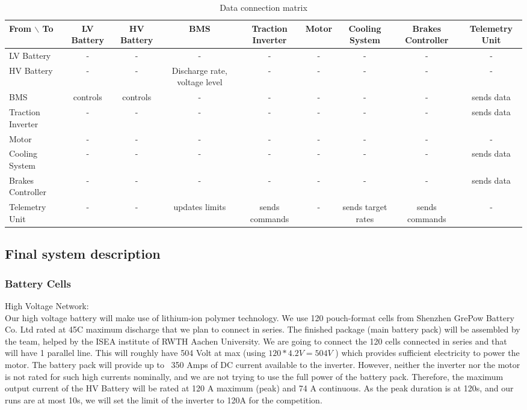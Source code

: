 \begin{table}
    \centering
    \begin{adjustbox}{width=\textwidth,center}
    \begin{tabular}{|l|c|c|c|c|c|c|c|c|}
    \hline
    From $\backslash$ To & LV Battery & HV Battery & BMS & Traction Inverter & Motor & Cooling System & Brakes Controller & Telemetry Unit  \\
    \hline
    LV Battery & - & - & - & - & - & - & - & - \\
    HV Battery  & - & - & Discharge rate, voltage level & - & - & - & - & - \\
    BMS & controls & controls & - & - & - & - & - & sends data \\
    Traction Inverter & - & - & - & - & - & - & - & sends data \\
    Motor & - & - & - & - & - & - & - & - \\
    Cooling System & - & - & - & - & - & - & - & sends data \\
    Brakes Controller & - & - & - & - & - & - & - & sends data \\
    Telemetry Unit & - & - & updates limits & sends commands & - & sends target rates & sends commands & - \\
    \hline
    \end{tabular}
    \end{adjustbox}
    \caption{Data connection matrix}
    \label{data-connectivity-matrix-battery}
\end{table}


\subsection{Final system description}
\subsubsection{Battery Cells}

High Voltage Network: \\
Our high voltage battery will make use of lithium-ion polymer technology. We use 120 pouch-format cells from Shenzhen GrePow Battery Co. Ltd rated at 45C maximum discharge that we plan to connect in series. 
The finished package (main battery pack) will be assembled by the team, helped by the ISEA institute of RWTH Aachen University.
We are going to connect the 120 cells connected in series and that will have 1 parallel line. This will roughly have 504 Volt at max (using \(120 * 4.2V = 504 V \) ) 
which provides sufficient electricity to power the motor.
The battery pack will provide up to ~350 Amps of DC current available to the inverter. However, neither the inverter nor the motor is not rated for such high currents nominally, and we are not trying to use the full power of the battery pack.
\newline
Therefore, the maximum output current of the HV Battery will be rated at 120 A maximum (peak) and 74 A continuous. As the peak duration is at 120s, and our runs are at most 10s, we will set the limit of the inverter to 120A for the competition.
